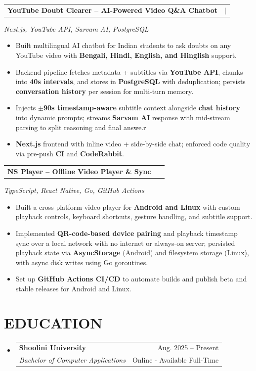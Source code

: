 \documentclass[letterpaper,10pt]{article}
\makeatletter
\newcommand{\myuline}[1]{%
  \uline{\phantom{#1}}%
  \llap{\contour{white}{#1}}%
}
\newcommand{\resumeItem}[1]{
  \item\normalsize{
    {#1 \vspace{-1pt}}
  }
}
\newcommand{\resumeSubheading}[4]{
  \vspace{-1pt}\item
    \begin{tabular*}{\textwidth}[t]{l@{\extracolsep{\fill}}r}
      \textbf{#1} & {\color{dark-grey}\small #2}\vspace{1pt}\\ %
      \textit{\small #3} & {\color{dark-grey}\small #4}\\ %
    \end{tabular*}\vspace{-4pt}
}
\newcommand{\resumeProjectHeading}[2]{
    \item
    \begin{tabular*}{\textwidth}{l@{\extracolsep{\fill}}r}
      {\large #1} & {\color{dark-grey}\small#2} \\[2pt]
    \end{tabular*}
}
\newcommand{\resumeSubHeadingListStart}{\begin{itemize}[leftmargin=0in, label={}]}
\newcommand{\resumeSubHeadingListEnd}{\end{itemize}}
\newcommand{\resumeItemListStart}{\begin{itemize}}
\newcommand{\resumeItemListEnd}{\end{itemize}\vspace{0pt}}
\makeatother
\begin{document}
    \resumeProjectHeading
      {\textbf{YouTube Doubt Clearer -- AI-Powered Video Q\&A Chatbot}}
      {\href{https://github.com/subratamondal1029/youtube-doubt}{\myuline{Code}}
      $|$ \href{https://youtube-doubt.vercel.app}{\myuline{Live}}}
      {\footnotesize\emph{Next.js, YouTube API, Sarvam AI, PostgreSQL}}
    \resumeItemListStart
      \resumeItem{Built multilingual AI chatbot for Indian students to ask doubts on any YouTube video with \textbf{Bengali, Hindi, English, and Hinglish} support.}
      \resumeItem{Backend pipeline fetches metadata + subtitles via \textbf{YouTube API}, chunks into \textbf{40s intervals}, and stores in \textbf{PostgreSQL} with deduplication; persists \textbf{conversation history} per session for multi-turn memory.}
      \resumeItem{Injects \textbf{$\pm$90s timestamp-aware} subtitle context alongside \textbf{chat history} into dynamic prompts; streams \textbf{Sarvam AI} response with mid-stream parsing to split reasoning and final answe.r}
      \resumeItem{\textbf{Next.js} frontend with inline video + side-by-side chat; enforced code quality via pre-push \textbf{CI} and \textbf{CodeRabbit}.}
    \resumeItemListEnd
          
    \resumeProjectHeading
    {\textbf{NS Player -- Offline Video Player \& Sync}}
    {\href{https://github.com/subratamondal1029/ns-player}{\myuline{Code}} \textbar\ \href{https://github.com/subratamondal1029/ns-player/releases}{\myuline{Releases}}}
    {\footnotesize\emph{TypeScript, React Native, Go, GitHub Actions}}
    \resumeItemListStart
    \resumeItem{Built a cross-platform video player for \textbf{Android and Linux} with custom playback controls, keyboard shortcuts, gesture handling, and subtitle support.}
    \resumeItem{Implemented \textbf{QR-code-based device pairing} and playback timestamp sync over a local network with no internet or always-on server; persisted playback state via \textbf{AsyncStorage} (Android) and filesystem storage (Linux), with async disk writes using Go goroutines.}
    \resumeItem{Set up \textbf{GitHub Actions CI/CD} to automate builds and publish beta and stable releases for Android and Linux.}
    \resumeItemListEnd


\section {EDUCATION}
  \resumeSubHeadingListStart
    \resumeSubheading
      {Shoolini University}{Aug. 2025 -- Present}
      {Bachelor of Computer Applications}{Online - Available Full-Time}
  \resumeSubHeadingListEnd


\end{document}
